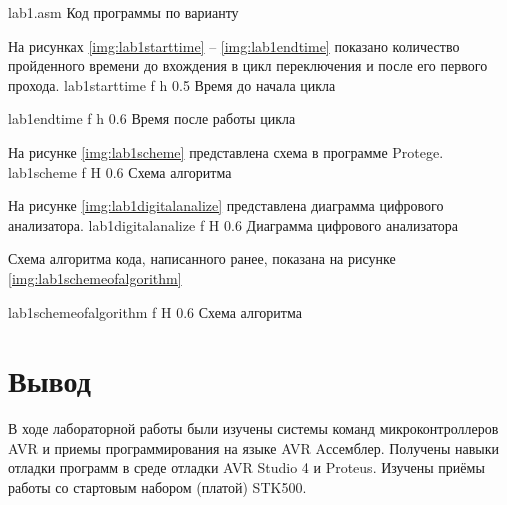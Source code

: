\documentclass{bmstu}
\begin{document}
    {lab1.asm}
    {Код программы по варианту}

На рисунках \ref{img:lab1starttime} -- \ref{img:lab1endtime} показано количество пройденного времени до вхождения в цикл переключения и после его первого прохода.
    {lab1starttime} %
    {f} %
    {h} %
    {0.5\textwidth} %
    {Время до начала цикла} %

    {lab1endtime} %
    {f} %
    {h} %
    {0.6\textwidth} %
    {Время после работы цикла} %
    
На рисунке \ref{img:lab1scheme} представлена схема в программе Protege.
    {lab1scheme} %
    {f} %
    {H} %
    {0.6\textwidth} %
    {Схема алгоритма} %
    
На рисунке \ref{img:lab1digitalanalize} представлена диаграмма цифрового анализатора.
    {lab1digitalanalize} %
    {f} %
    {H} %
    {0.6\textwidth} %
    {Диаграмма цифрового анализатора} %

\newpage
Схема алгоритма кода, написанного ранее, показана на рисунке \ref{img:lab1schemeofalgorithm}

    {lab1schemeofalgorithm} %
    {f} %
    {H} %
    {0.6\textwidth} %
    {Схема алгоритма} %

\section{Вывод}
В ходе лабораторной работы были изучены системы команд микроконтроллеров AVR и
приемы программирования на языке AVR Aссемблер. Получены навыки
отладки программ в среде отладки AVR Studio 4 и Proteus. Изучены приёмы
работы со стартовым набором (платой) STK500.
\newpage
\end{document}
